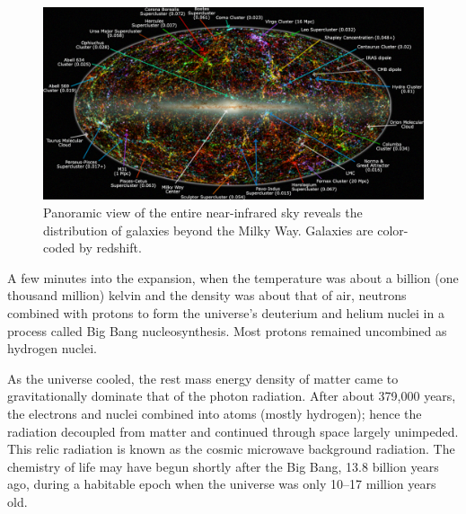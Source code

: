 \documentclass[14pt, oneside]{book}
\begin{document}
			\begin{figure}
				\centering
				\includegraphics[width=0.9\linewidth]{images/near-infrared.jpg}
				\caption{Panoramic view of the entire near-infrared sky reveals the distribution of galaxies beyond the Milky Way. Galaxies are color-coded by redshift.}
				\label{img:redshift}
			\end{figure}
	
			A few minutes into the expansion, when the temperature was about a billion (one thousand million) kelvin and the density was about that of air, neutrons combined with protons to form the universe's deuterium and helium nuclei in a process called Big Bang nucleosynthesis. Most protons remained uncombined as hydrogen nuclei.
	
			As the universe cooled, the rest mass energy density of matter came to gravitationally dominate that of the photon radiation. After about 379,000 years, the electrons and nuclei combined into atoms (mostly hydrogen); hence the radiation decoupled from matter and continued through space largely unimpeded. This relic radiation is known as the cosmic microwave background radiation. The chemistry of life may have begun shortly after the Big Bang, 13.8 billion years ago, during a habitable epoch when the universe was only 10–17 million years old. 
	
\end{document}
